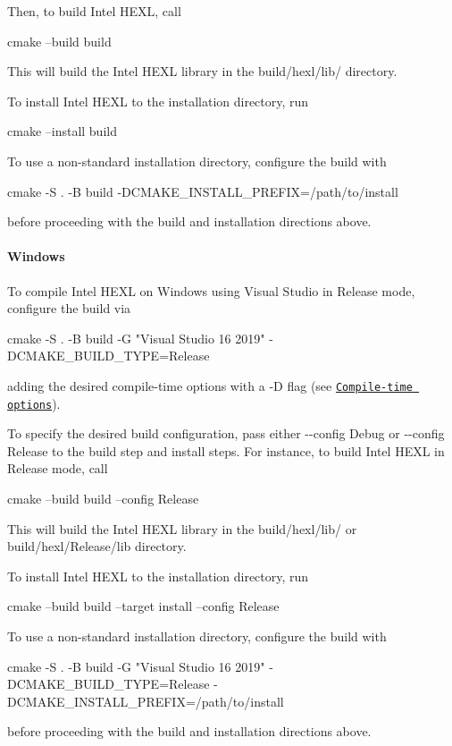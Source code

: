 Then, to build Intel H\+E\+XL, call 
\begin{DoxyCode}
cmake --build build
\end{DoxyCode}
 This will build the Intel H\+E\+XL library in the {\ttfamily build/hexl/lib/} directory.

To install Intel H\+E\+XL to the installation directory, run 
\begin{DoxyCode}
cmake --install build
\end{DoxyCode}
 To use a non-\/standard installation directory, configure the build with 
\begin{DoxyCode}
cmake -S . -B build -DCMAKE\_INSTALL\_PREFIX=/path/to/install
\end{DoxyCode}
 before proceeding with the build and installation directions above.

\paragraph*{Windows}

To compile Intel H\+E\+XL on Windows using Visual Studio in Release mode, configure the build via 
\begin{DoxyCode}
cmake -S . -B build -G "Visual Studio 16 2019" -DCMAKE\_BUILD\_TYPE=Release
\end{DoxyCode}
 adding the desired compile-\/time options with a {\ttfamily -\/D} flag (see \href{#compile-time-options}{\tt Compile-\/time options}).

To specify the desired build configuration, pass either {\ttfamily -\/-\/config Debug} or {\ttfamily -\/-\/config Release} to the build step and install steps. For instance, to build Intel H\+E\+XL in Release mode, call 
\begin{DoxyCode}
cmake --build build --config Release
\end{DoxyCode}
 This will build the Intel H\+E\+XL library in the {\ttfamily build/hexl/lib/} or {\ttfamily build/hexl/\+Release/lib} directory.

To install Intel H\+E\+XL to the installation directory, run 
\begin{DoxyCode}
cmake --build build --target install --config Release
\end{DoxyCode}
 To use a non-\/standard installation directory, configure the build with 
\begin{DoxyCode}
cmake -S . -B build -G "Visual Studio 16 2019" -DCMAKE\_BUILD\_TYPE=Release
       -DCMAKE\_INSTALL\_PREFIX=/path/to/install
\end{DoxyCode}
 before proceeding with the build and installation directions above.

